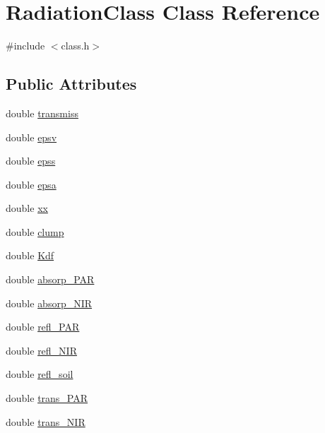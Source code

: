 \hypertarget{class_radiation_class}{}\section{Radiation\+Class Class Reference}
\label{class_radiation_class}


{\ttfamily \#include $<$class.\+h$>$}

\subsection*{Public Attributes}
\begin{DoxyCompactItemize}
\item 
double \hyperlink{class_radiation_class_a131eeff6a865f1f5e18d0ce212324e11}{transmiss}
\item 
double \hyperlink{class_radiation_class_af8d9c246327b824ddb9485289cba3034}{epsv}
\item 
double \hyperlink{class_radiation_class_a71e37e086eef648dbcf183f92b79d6d0}{epss}
\item 
double \hyperlink{class_radiation_class_a90c92020fe915b3417f3703340388893}{epsa}
\item 
double \hyperlink{class_radiation_class_aa3c9e6cfd66690e7c32e3baea6761f27}{xx}
\item 
double \hyperlink{class_radiation_class_a8203d3f8c15b2fb72f5a282935df0955}{clump}
\item 
double \hyperlink{class_radiation_class_a3153f0d185824627dcb2e352453a38a3}{Kdf}
\item 
double \hyperlink{class_radiation_class_a9dd282095aa17e8ff8c5b084fe5d3129}{absorp\+\_\+\+P\+AR}
\item 
double \hyperlink{class_radiation_class_a7302cb563a97a155d26746c1a18dbce9}{absorp\+\_\+\+N\+IR}
\item 
double \hyperlink{class_radiation_class_a1d762103a88ec43afab57d9ef4737f05}{refl\+\_\+\+P\+AR}
\item 
double \hyperlink{class_radiation_class_a490f8051cbe729c4b7cd2f27bfb58e30}{refl\+\_\+\+N\+IR}
\item 
double \hyperlink{class_radiation_class_ab49c53c2777a4103664960bcb1625ed3}{refl\+\_\+soil}
\item 
double \hyperlink{class_radiation_class_ad859677e3f655775bec7a38754787499}{trans\+\_\+\+P\+AR}
\item 
double \hyperlink{class_radiation_class_a1806d3532dd43f0587cf628ce4c230c1}{trans\+\_\+\+N\+IR}
\end{DoxyCompactItemize}


